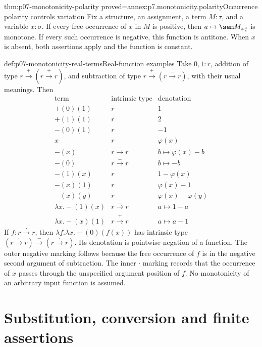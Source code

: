 \begin{hblemma}{thm:p07-monotonicity-polarity}
 {proved=annex:p7.monotonicity.polarity}{Occurrence polarity controls variation}
Fix a structure, an assignment, a term \(M:\tau\), and a variable
\(x:\sigma\). If every free occurrence of \(x\) in \(M\) is positive,
then \(a\mapsto\sem M_{\varphi_x^a}\) is monotone.
If every such occurrence is negative, this function is antitone.
When \(x\) is absent, both assertions apply and the function is constant.
\end{hblemma}

\begin{hbexample}{def:p07-monotonicity-real-terms}{Real-function examples}
Take \(0,1:r\), addition of type
\(r\xrightarrow+(r\xrightarrow+r)\), and subtraction of type
\(r\xrightarrow+(r\xrightarrow-r)\), with their usual meanings.
Then
\[
 \begin{array}{c|c|c}
 \text{term}&\text{intrinsic type}&\text{denotation}\\ \hline
 +(0)(1)&r&1\\
 +(1)(1)&r&2\\
 -(0)(1)&r&-1\\
 x&r&\varphi(x)\\
 -(x)&r\xrightarrow-r&b\mapsto\varphi(x)-b\\
 -(0)&r\xrightarrow-r&b\mapsto-b\\
 -(1)(x)&r&1-\varphi(x)\\
 -(x)(1)&r&\varphi(x)-1\\
 -(x)(y)&r&\varphi(x)-\varphi(y)\\
 \lambda x.-(1)(x)&r\xrightarrow-r&a\mapsto1-a\\
 \lambda x.-(x)(1)&r\xrightarrow+r&a\mapsto a-1
 \end{array}
\]
If \(f:r\xrightarrow{\cdot}r\), then
\(\lambda f.\lambda x.-(0)(f(x))\) has intrinsic type
\((r\xrightarrow{\cdot}r)\xrightarrow{-}
 (r\xrightarrow{\cdot}r)\).
Its denotation is pointwise negation of a function. The outer negative
marking follows because the free occurrence of \(f\) is in the negative
second argument of subtraction. The inner \(\cdot\) marking records that
the occurrence of \(x\) passes through the unspecified argument position
of \(f\). No monotonicity of an arbitrary input function is assumed.
\end{hbexample}

\section{Substitution, conversion and finite assertions}

